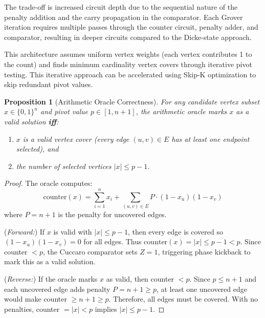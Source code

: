 \documentclass{ieeeaccess}
\newtheorem{prop}{Proposition}
\newenvironment{prf}{\begin{proof}}{\end{proof}}
\begin{document}
The trade-off is increased circuit depth due to the
sequential nature of the penalty addition and the carry
propagation in the comparator. Each Grover iteration
requires multiple passes through the counter circuit,
penalty adder, and comparator, resulting in deeper circuits
compared to the Dicke-state approach.

This architecture assumes uniform vertex weights (each
vertex contributes 1 to the count) and finds minimum
cardinality vertex covers through iterative pivot testing.
This iterative approach can be accelerated using Skip-K
optimization to skip redundant pivot values.

\begin{prop}[Arithmetic Oracle Correctness]
\label{theo:arithmetic_correctness}
For any candidate vertex subset $x \in \{0,1\}^n$ and pivot
value $p \in [1, n+1]$, the arithmetic oracle marks $x$ as a
valid solution \textbf{iff}:
\begin{enumerate}
    \item $x$ is a valid vertex cover (every edge $(u,v) \in E$
    has at least one endpoint selected), and
    \item the number of selected vertices $|x| \leq p-1$.
\end{enumerate}
\end{prop}

\begin{prf}
The oracle computes:
\begin{equation}
    \mathrm{counter}(x)
    = \sum_{i=1}^n x_i
    + \sum_{(u,v) \in E} P \cdot (1-x_u)(1-x_v)
    \label{eq:arith-counter}
\end{equation}
where $P = n+1$ is the penalty for uncovered edges.

\noindent(\textit{Forward:}) If $x$ is valid with
$|x| \leq p-1$, then every edge is covered so
$(1-x_u)(1-x_v) = 0$ for all edges. Thus
$\mathrm{counter}(x) = |x| \leq p-1 < p$. Since counter
$< p$, the Cuccaro comparator sets $Z = 1$, triggering phase
kickback to mark this as a valid solution.

\noindent(\textit{Reverse:}) If the oracle marks $x$ as
valid, then counter $< p$. Since $p \leq n+1$ and each
uncovered edge adds penalty $P = n+1 \geq p$, at least one
uncovered edge would make counter $\geq n+1 \geq p$.
Therefore, all edges must be covered. With no penalties,
counter $= |x| < p$ implies $|x| \leq p-1$.
\end{prf}
\end{document}
